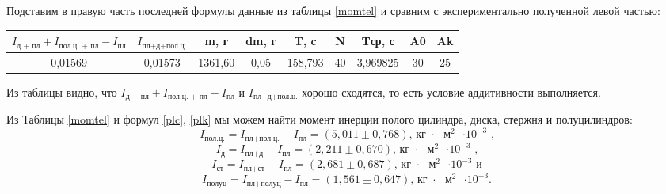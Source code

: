 \documentclass[a4paper,14pt]{extarticle}
\begin{document}
	Подставим в правую часть последней формулы данные из таблицы \eqref{momtel} и сравним с экспериментально полученной левой частью:   
	\begin{table}[!h]
		\begin{center}
			\begin{tabular}{|c|c|c|c|c|c|c|c|c|}
				\hline
				$I_\text{д + пл} + I_\text{пол.ц. + пл} - I_\text{пл}$ &  $I_\text{пл+д+пол.ц.}$ & m, г & dm, г & T, c & N & Tср, с & A0 & Ak \\ \hline
				0,01569 & 0,01573 & 1361,60 & 0,05 & 158,793 & 40 & 3,969825 & 30 & 25 \\ \hline
			\end{tabular}
		\end{center}
	\end{table}
	
	\noindent Из таблицы видно, что $I_\text{д + пл} + I_\text{пол.ц. + пл} - I_\text{пл}$ и  $I_\text{пл+д+пол.ц.}$ хорошо сходятся, то есть условие аддитивности выполняется.
	
	Из Таблицы \eqref{momtel} и формул \eqref{plc}, \eqref{plk} мы можем найти момент инерции полого цилиндра, диска, стержня и полуцилиндров:
	$$I_\text{пол.ц.} = I_\text{пл+пол.ц.} - I_\text{пл} = \left(5,011 \pm 0,768\right) \text{,  кг $\cdot$ $\text{м}^2$ $\cdot 10^{-3}$}\text{ ,}$$
	$$I_\text{д} = I_\text{пл+д} - I_\text{пл} = \left(2,211 \pm 0,670\right) \text{,  кг $\cdot$ $\text{м}^2$ $\cdot 10^{-3}$}\text{ ,}$$
	$$I_\text{ст} = I_\text{пл+ст} - I_\text{пл} = \left(2,681 \pm 0,687\right) \text{,  кг $\cdot$ $\text{м}^2$ $\cdot 10^{-3}$}\text{ и}$$
	$$I_\text{полуц} = I_\text{пл+полуц} - I_\text{пл} = \left(1,561 \pm 0,647\right) \text{,  кг $\cdot$ $\text{м}^2$ $\cdot 10^{-3}$}.$$
	
\end{document}

